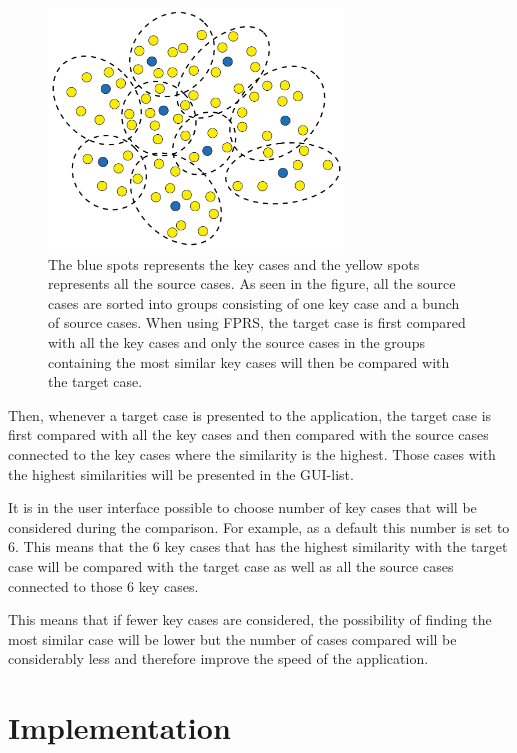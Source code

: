 \documentclass[12pt]{article}
\begin{document}
\begin{figure}[h]
\centering
\includegraphics[width=0.7\textwidth]{fprs-1.png}
\caption{\label{fig:fprs-1.png}The blue spots represents the key cases and the yellow spots represents all the source cases. As seen in the figure, all the source cases are sorted into groups consisting of one key case and a bunch of source cases. When using FPRS, the target case is first compared with all the key cases and only the source cases in the groups containing the most similar key cases will then be compared with the target case.}
\end{figure}

Then, whenever a target case is presented to the application, the target case is first compared with all the key cases and then compared with the source cases connected to the key cases where the similarity is the highest. Those cases with the highest similarities will be presented in the GUI-list. 

It is in the user interface possible to choose number of key cases that will be considered during the comparison. For example, as a default this number is set to 6. This means that the 6 key cases that has the highest similarity with the target case will be compared with the target case as well as all the source cases connected to those 6 key cases. 

This means that if fewer key cases are considered, the possibility of finding the most similar case will be lower but the number of cases compared will be considerably less and therefore improve the speed of the application. 

\clearpage

\section{Implementation}
\label{sec:implementation}
\end{document}
